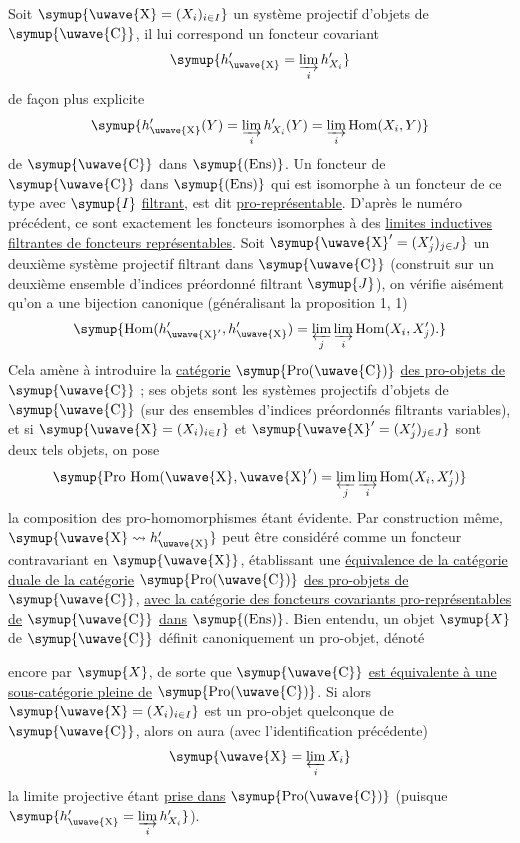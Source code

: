 Soit $\symup{\text{\uwave{X}}=(X_i)_{i\in I}}$ un système projectif d'objets de
$\symup{\text{\uwave{C}}}$, il lui correspond un foncteur covariant
\[
  \symup{h'_{\text{\uwave{X}}}=\varinjlim\limits_i h'_{X_i}}
\]
de façon plus explicite
\[
  \symup{h'_{\text{\uwave{X}}}(Y)=\varinjlim\limits_i h'_{X_i}(Y)
  =\varinjlim\limits_i\operatorname{Hom}(X_i,Y)}
\]
de $\symup{\text{\uwave{C}}}$ dans $\symup{(\operatorname{Ens})}$. Un foncteur de $\symup{\text{\uwave{C}}}$ dans
$\symup{(\operatorname{Ens})}$ qui est isomorphe à un foncteur de ce type avec $\symup{I}$
\uline{filtrant}, est dit \uline{pro-représentable}. D'après le numéro précédent, ce
sont exactement les foncteurs isomorphes à des \uline{limites inductives filtrantes de foncteurs représentables}. Soit
$\symup{\text{\uwave{X}}'=(X'_j)_{j\in J}}$ un deuxième système projectif filtrant dans
$\symup{\text{\uwave{C}}}$ (construit sur un deuxième ensemble d'indices préordonné filtrant
$\symup{J}$), on vérifie aisément qu'on a une bijection canonique (généralisant la
proposition 1, 1)
\[
  \symup{\operatorname{Hom}(h'_{\text{\uwave{X}}'},h'_{\text{\uwave{X}}})
  =\varprojlim\limits_j\varinjlim\limits_i\operatorname{Hom}(X_i,X'_j).}
\]
Cela amène à introduire la \uline{catégorie} $\symup{\operatorname{Pro}(\text{\uwave{C}})}$ \uline{des pro-objets de} $\symup{\text{\uwave{C}}}$ ; ses objets sont les systèmes projectifs d'objets
de $\symup{\text{\uwave{C}}}$ (sur des ensembles d'indices préordonnés filtrants variables),
et si $\symup{\text{\uwave{X}}=(X_i)_{i\in I}}$ et
$\symup{\text{\uwave{X}}'=(X'_j)_{j\in J}}$ sont deux tels objets, on pose
\[
  \symup{\operatorname{Pro\ Hom}(\text{\uwave{X}},\text{\uwave{X}}')
  =\varprojlim\limits_j\varinjlim\limits_i\operatorname{Hom}(X_i,X'_j)}
\]
la composition des pro-homomorphismes étant évidente. Par construction même,
$\symup{\text{\uwave{X}}\rightsquigarrow h'_{\text{\uwave{X}}}}$ peut être considéré comme un
foncteur contravariant en $\symup{\text{\uwave{X}}}$, établissant une \uline{équivalence de la
catégorie duale de la catégorie} $\symup{\operatorname{Pro}(\text{\uwave{C}})}$ \uline{des
pro-objets de} $\symup{\text{\uwave{C}}}$, \uline{avec la catégorie des foncteurs covariants
pro-représentables de} $\symup{\text{\uwave{C}}}$ \uline{dans} $\symup{(\operatorname{Ens})}$. Bien entendu,
un objet $\symup{X}$ de $\symup{\text{\uwave{C}}}$ définit canoniquement un pro-objet, dénoté

encore par $\symup{X}$, de sorte que $\symup{\text{\uwave{C}}}$ \uline{est équivalente à une sous-catégorie pleine de} $\symup{\operatorname{Pro}(\text{\uwave{C}})}$. Si alors
$\symup{\text{\uwave{X}}=(X_i)_{i\in I}}$ est un pro-objet quelconque de $\symup{\text{\uwave{C}}}$, alors on aura (avec l'identification précédente)
\[
  \symup{\text{\uwave{X}}=\varprojlim\limits_i X_i}
\]
la limite projective étant \uline{prise dans} $\symup{\operatorname{Pro}(\text{\uwave{C}})}$
(puisque $\symup{h'_{\text{\uwave{X}}}=\varinjlim\limits_i h'_{X_i}}$).

